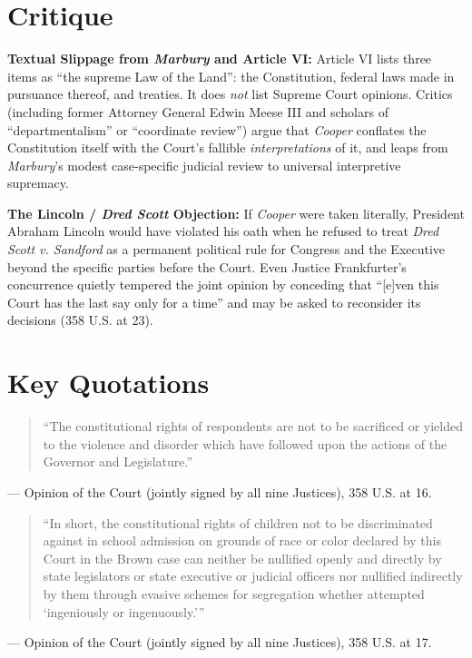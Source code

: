 \documentclass[12pt]{article}
\begin{document}
\section{Critique}
\textbf{Textual Slippage from \textit{Marbury} and Article VI:} Article VI lists three items as ``the supreme Law of the Land'': the Constitution, federal laws made in pursuance thereof, and treaties. It does \emph{not} list Supreme Court opinions. Critics (including former Attorney General Edwin Meese III and scholars of ``departmentalism'' or ``coordinate review'') argue that \textit{Cooper} conflates the Constitution itself with the Court's fallible \emph{interpretations} of it, and leaps from \textit{Marbury}'s modest case-specific judicial review to universal interpretive supremacy.

\textbf{The Lincoln / \textit{Dred Scott} Objection:} If \textit{Cooper} were taken literally, President Abraham Lincoln would have violated his oath when he refused to treat \textit{Dred Scott v. Sandford} as a permanent political rule for Congress and the Executive beyond the specific parties before the Court. Even Justice Frankfurter's concurrence quietly tempered the joint opinion by conceding that ``[e]ven this Court has the last say only for a time'' and may be asked to reconsider its decisions (358 U.S. at 23).

\section{Key Quotations}
\begin{quote}
``The constitutional rights of respondents are not to be sacrificed or yielded to the violence and disorder which have followed upon the actions of the Governor and Legislature.''
\end{quote}
\noindent --- Opinion of the Court (jointly signed by all nine Justices), 358 U.S. at 16.

\begin{quote}
``In short, the constitutional rights of children not to be discriminated against in school admission on grounds of race or color declared by this Court in the Brown case can neither be nullified openly and directly by state legislators or state executive or judicial officers nor nullified indirectly by them through evasive schemes for segregation whether attempted `ingeniously or ingenuously.'''
\end{quote}
\noindent --- Opinion of the Court (jointly signed by all nine Justices), 358 U.S. at 17.
\end{document}
